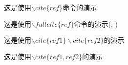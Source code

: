 \documentclass{ctexart} %
\newcommand{\fullcite}[1]{(\citeauthor{#1}, \citeyear{#1})\cite{#1}} %
\begin{document}
这是使用$\backslash cite\{ref\}$命令的演示\cite{Castamere2024AddReference} 

这是使用$\backslash fullcite\{ref\}$命令的演示\fullcite{Castamere2024AddReference} 

这是使用$\backslash cite\{ref1\}\backslash cite\{ref2\}$的演示\cite{Castamere2024AddReference}\cite{Castamere2024如何添加}

这是使用$\backslash cite\{ref1, ref2\}$的演示\cite{Castamere2024AddReference, Castamere2024如何添加}


\end{document}
